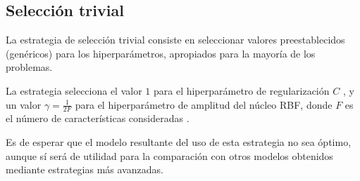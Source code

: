 %
%
\subsection{Selección trivial}
%
La estrategia de selección trivial consiste en seleccionar valores
preestablecidos (genéricos) para los hiperparámetros, apropiados para
la mayoría de los problemas.

La estrategia selecciona el valor $1$ para el hiperparámetro de
regularización $C$ \cite{libsvm}, y un valor $\gamma=\frac{1}{2F}$
para el hiperparámetro de amplitud del núcleo RBF, donde $F$ es el
número de características consideradas \cite{glasmachersigel}.

Es de esperar que el modelo resultante del uso de esta estrategia no
sea óptimo, aunque sí será de utilidad para la comparación con otros
modelos obtenidos mediante estrategias más avanzadas.
